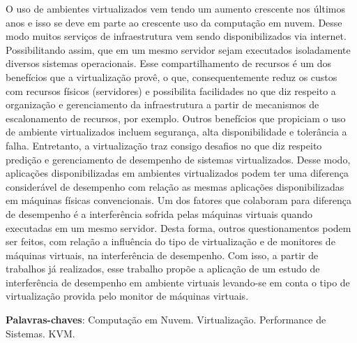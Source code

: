 \begin{resumo}
 O uso de ambientes virtualizados vem tendo um aumento crescente nos últimos anos e isso se deve em parte ao crescente uso da computação em nuvem. Desse modo muitos serviços de infraestrutura vem sendo disponibilizados via internet. Possibilitando assim, que em um mesmo servidor sejam executados isoladamente diversos sistemas operacionais. Esse compartilhamento de recursos é um dos benefícios que a virtualização provê, o que, consequentemente reduz os custos com recursos físicos (servidores) e possibilita facilidades no que diz respeito a organização e gerenciamento da infraestrutura a partir de mecanismos de escalonamento de recursos, por exemplo. Outros benefícios que propiciam o uso de ambiente virtualizados incluem segurança, alta disponibilidade e tolerância a falha. Entretanto, a virtualização traz consigo desafios no que diz respeito predição e gerenciamento de desempenho de sistemas virtualizados. Desse modo, aplicações disponibilizadas em ambientes virtualizados podem ter uma diferença considerável de desempenho com relação as mesmas aplicações disponibilizadas em máquinas físicas convencionais. Um dos fatores que colaboram para diferença de desempenho é a interferência sofrida pelas máquinas virtuais quando executadas em um mesmo servidor. Desta forma, outros questionamentos podem ser feitos, com relação a influência  do tipo de virtualização e de monitores de máquinas virtuais, na interferência de desempenho. 
Com isso, a partir de trabalhos já realizados, esse trabalho propõe a aplicação de um estudo de interferência de desempenho em ambiente virtuais levando-se em conta o tipo de virtualização provida pelo monitor de máquinas virtuais. 





 \vspace{\onelineskip}
    
 \noindent
 \textbf{Palavras-chaves}: Computação em Nuvem. Virtualização. Performance de Sistemas. KVM.
\end{resumo}
